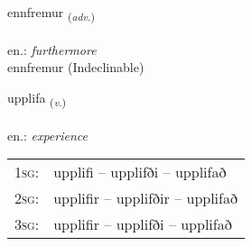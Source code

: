 \documentclass[frontgrid, backgrid]{flacards}\usepackage[]{graphicx}\usepackage[]{xcolor}
\begin{document}

\renewcommand{\flhead}{\vskip5pt \fboxsep=0pt {\small\bfseries\footnotesize Atviksorð | Adverb}}
\renewcommand{\fcfoot}{\vskip5pt \fboxsep=0pt \hspace{2pt}{\small\bfseries\footnotesize 2K}}

\renewcommand{\blhead}{\vskip5pt {\small\bfseries\footnotesize Atviksorð | Adverb }}
\renewcommand{\bcfoot}{\vskip5pt \hspace{2pt}{\small\bfseries\footnotesize 2K}}


{ennfremur \small{\textsubscript{(\textit{adv.})}} \\[1ex]
\textphonetic{[ɛnfrɛmʏr]} \\
en.: \emph{furthermore} \\  [2ex]
ennfremur (Indeclinable)}

\renewcommand{\flhead}{\vskip5pt \fboxsep=0pt {\small\bfseries\footnotesize Sagnorð | Verb}}
\renewcommand{\fcfoot}{\vskip5pt \fboxsep=0pt \hspace{2pt}{\small\bfseries\footnotesize 2K}}

\renewcommand{\blhead}{\vskip5pt {\small\bfseries\footnotesize Sagnorð | Verb }}
\renewcommand{\bcfoot}{\vskip5pt \hspace{2pt}{\small\bfseries\footnotesize 2K}}


{upplifa \small{\textsubscript{(\textit{v.})}} \\[1ex] %
\textphonetic{[ʏhplɪva]} \\
en.: \emph{experience} \\  [2ex]
\renewcommand*{\arraystretch}{0.8}
\begin{tabular}{p{1cm}l}
\textsc{1sg}: & upplifi -- upplifði -- upplifað \\ 
\textsc{2sg}: & upplifir -- upplifðir -- upplifað \\ 
\textsc{3sg}: & upplifir -- upplifði -- upplifað \\ 
\end{tabular}
}
\end{document}
